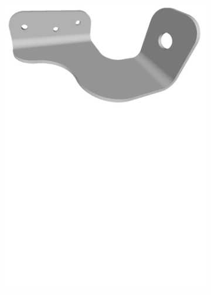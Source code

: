 \begin{figure}[h!]
{\begin{tcolorbox}
\begin{subfigure}[c]{.23\textwidth}
          \includegraphics[trim={0cm 17cm 0cm 0cm},clip,width=1\linewidth,angle=0]{Cap5/Figuras/objects/double_side_bracket.pdf}
          \caption{}
          \label{fig:Double_side_bracket}
      \end{subfigure}
      \hfill
      \begin{subfigure}[c]{.23\textwidth}
         \centering

\end{subfigure}
\end{tcolorbox}}
\end{figure}
